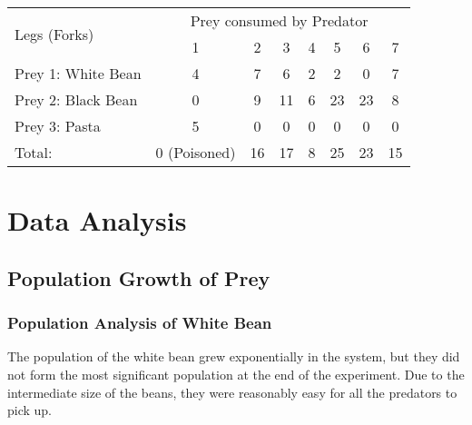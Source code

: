 \documentclass{scrartcl}
\begin{document}
\begin{table}[H]
\centering
\begin{tabular}{|l|c|c|c|c|c|c|c|}
\hline
    \multirow{2}{*}{Legs (Forks)} & \multicolumn{7}{c|}{Prey consumed by Predator} \\
    \cline{2-8}
    & 1 & 2 & 3 & 4 & 5 & 6 & 7 \\
    \hline \hline
    Prey 1: White Bean & 4 & 7 & 6 & 2 & 2 & 0 & 7\\ 
    \hline
    Prey 2: Black Bean & 0 & 9 & 11 & 6 & 23 & 23 & 8\\
    \hline
    Prey 3: Pasta & 5 & 0 & 0 & 0 & 0 & 0 & 0\\
    \hline
    Total:        & 0 (Poisoned) & 16 & 17 & 8 & 25 & 23 & 15\\
    \hline
\end{tabular}
\end{table}

\section{Data Analysis}

\subsection{Population Growth of Prey}

\subsubsection{Population Analysis of White Bean}
\begin{center}
\end{center}

The population of the white bean grew exponentially in the system, but they did not form the most significant population at the end of the experiment. Due to the intermediate size of the beans, they were reasonably easy for all the predators to pick up. 
\end{document}

